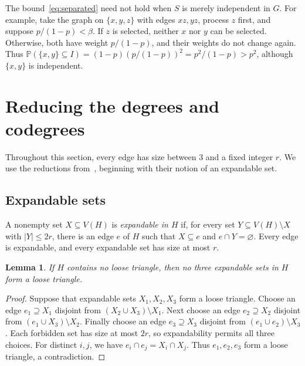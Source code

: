 \documentclass[11pt]{article}
\numberwithin{equation}{section}
\newtheorem{lemma}[theorem]{Lemma}
\theoremstyle{remark}
\newcommand{\Pp}{\mathbb P}
\begin{document}
The bound~\eqref{eq:separated} need not hold when $S$ is merely independent in $G$. For example, take the graph on $\{x,y,z\}$ with edges $xz,yz$, process $z$ first, and suppose $p/(1-p)<\beta$. If $z$ is selected, neither $x$ nor $y$ can be selected. Otherwise, both have weight $p/(1-p)$, and their weights do not change again. Thus $\Pp(\{x,y\}\subseteq I)=(1-p)(p/(1-p))^2=p^2/(1-p)>p^2$, although $\{x,y\}$ is independent.

\section{Reducing the degrees and codegrees}\label{sec:reduction}

Throughout this section, every edge has size between $3$ and a fixed integer $r$. We use the reductions from~\cite[Section~3]{KMV}, beginning with their notion of an expandable set.

\subsection{Expandable sets}
A nonempty set $X\subseteq V(H)$ is \emph{expandable in $H$} if, for every set $Y\subseteq V(H)\setminus X$ with $|Y|\le2r$, there is an edge $e$ of $H$ such that $X\subseteq e$ and $e\cap Y=\varnothing$. Every edge is expandable, and every expandable set has size at most $r$.

\begin{lemma}\label{lem:expand}
If $H$ contains no loose triangle, then no three expandable sets in $H$ form a loose triangle.
\end{lemma}
\begin{proof}
Suppose that expandable sets $X_1,X_2,X_3$ form a loose triangle. Choose an edge $e_1\supseteq X_1$ disjoint from $(X_2\cup X_3)\setminus X_1$. Next choose an edge $e_2\supseteq X_2$ disjoint from $(e_1\cup X_3)\setminus X_2$. Finally choose an edge $e_3\supseteq X_3$ disjoint from $(e_1\cup e_2)\setminus X_3$. Each forbidden set has size at most $2r$, so expandability permits all three choices. For distinct $i,j$, we have $e_i\cap e_j=X_i\cap X_j$. Thus $e_1,e_2,e_3$ form a loose triangle, a contradiction.
\end{proof}
\end{document}
